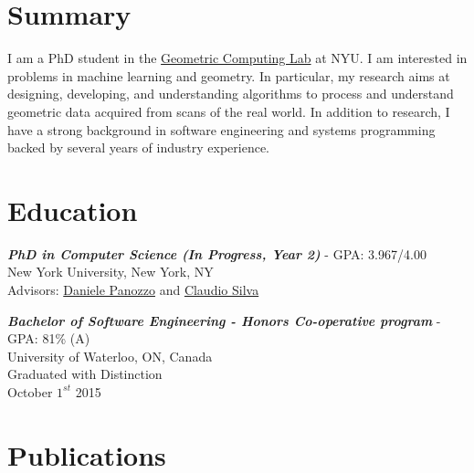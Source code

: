 \documentclass[line,10pt]{res}
\begin{document}
\address{francis@fwilliams.info}
\address{+1-650-701-7891}

\begin{resume}

\vspace{0.2em}
\section{\Large \sc \textbf Summary}
\vspace{0.5em}
I am a PhD student in the \href{https://cims.nyu.edu/gcl/}{Geometric Computing Lab} at NYU. I am interested in problems in machine learning and geometry. In particular, my research aims at designing, developing, and understanding algorithms to process and understand geometric data acquired from scans of the real world. In addition to research, I have a strong background in software engineering and systems programming backed by several years of industry experience.
\vspace{0.5em}





\vspace{0.2em}
\section{\Large \sc \textbf Education}
\vspace{0.5em}

{\sl \textbf{PhD in Computer Science (In Progress, Year 2)}} - GPA: 3.967/4.00 \\ 
New York University, New York, NY \\
Advisors: \href{https://cims.nyu.edu/gcl/daniele.html}{Daniele Panozzo} and \href{https://vgc.poly.edu/~csilva/}{Claudio Silva}

{\sl \textbf{Bachelor of Software Engineering - Honors Co-operative program}} - GPA: 81\% (A)\\ 
University of Waterloo, ON, Canada \\
Graduated with Distinction \\
October $1^{st}$ 2015




\vspace{0.2em}
\section{\Large \sc \textbf Publications}
\vspace{0.5em}


\end{resume}
\end{document}

